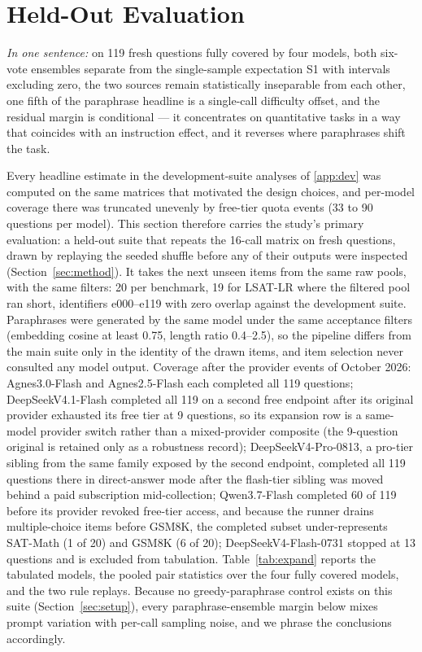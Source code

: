 \section{Held-Out Evaluation}
\label{sec:heldout}
\label{sec:expand}  %

\emph{In one sentence:} on 119 fresh questions fully covered by four models, both six-vote ensembles separate from the single-sample expectation S1 with intervals excluding zero, the two sources remain statistically inseparable from each other, one fifth of the paraphrase headline is a single-call difficulty offset, and the residual margin is conditional --- it concentrates on quantitative tasks in a way that coincides with an instruction effect, and it reverses where paraphrases shift the task.

Every headline estimate in the development-suite analyses of \ref{app:dev} was computed on the same matrices that motivated the design choices, and per-model coverage there was truncated unevenly by free-tier quota events (33 to 90 questions per model). This section therefore carries the study's primary evaluation: a held-out suite that repeats the 16-call matrix on fresh questions, drawn by replaying the seeded shuffle before any of their outputs were inspected (Section~\ref{sec:method}). It takes the next unseen items from the same raw pools, with the same filters: 20 per benchmark, 19 for LSAT-LR where the filtered pool ran short, identifiers e000--e119 with zero overlap against the development suite. Paraphrases were generated by the same model under the same acceptance filters (embedding cosine at least 0.75, length ratio 0.4--2.5), so the pipeline differs from the main suite only in the identity of the drawn items, and item selection never consulted any model output. Coverage after the provider events of October 2026: Agnes3.0-Flash and Agnes2.5-Flash each completed all 119 questions; DeepSeekV4.1-Flash completed all 119 on a second free endpoint after its original provider exhausted its free tier at 9 questions, so its expansion row is a same-model provider switch rather than a mixed-provider composite (the 9-question original is retained only as a robustness record); DeepSeekV4-Pro-0813, a pro-tier sibling from the same family exposed by the second endpoint, completed all 119 questions there in direct-answer mode after the flash-tier sibling was moved behind a paid subscription mid-collection; Qwen3.7-Flash completed 60 of 119 before its provider revoked free-tier access, and because the runner drains multiple-choice items before GSM8K, the completed subset under-represents SAT-Math (1 of 20) and GSM8K (6 of 20); DeepSeekV4-Flash-0731 stopped at 13 questions and is excluded from tabulation. Table~\ref{tab:expand} reports the tabulated models, the pooled pair statistics over the four fully covered models, and the two rule replays. Because no greedy-paraphrase control exists on this suite (Section~\ref{sec:setup}), every paraphrase-ensemble margin below mixes prompt variation with per-call sampling noise, and we phrase the conclusions accordingly.

